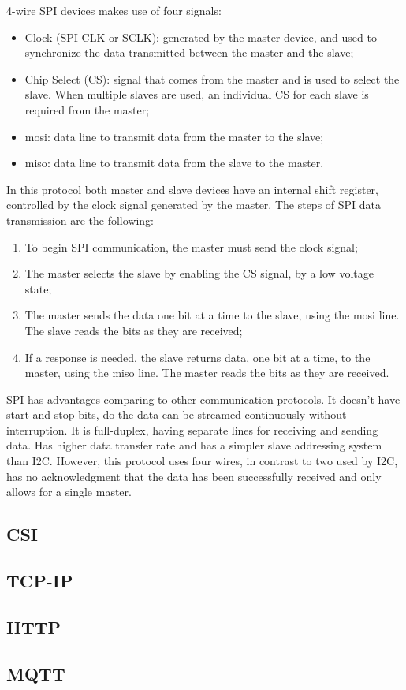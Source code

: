 4-wire SPI devices makes use of four signals:
\begin{itemize}
	\item Clock (SPI CLK or SCLK): generated by the master device, and used to synchronize the data transmitted between the master and the slave;
	\item Chip Select (CS): signal that comes from the master and is used to select the slave. When multiple slaves are used, an individual CS for each slave is required from the master;
	\item \ac{mosi}: data line to transmit data from the master to the slave;
	\item \ac{miso}: data line to transmit data from the slave to the master.
\end{itemize}


In this protocol both master and slave devices have an internal shift register, controlled by the clock signal generated by the master. The steps of SPI data transmission are the following:
\begin{enumerate}
	\item To begin SPI communication, the master must send the clock signal;
	\item The master selects the slave by enabling the CS signal, by a low voltage state;
	\item The master sends the data one bit at a time to the slave, using the \ac{mosi} line. The slave reads the bits as they are received;
	\item If a response is needed, the slave returns data, one bit at a time, to the master, using the \ac{miso} line. The master reads the bits as they are received.
\end{enumerate}

SPI has advantages comparing to other communication protocols. It doesn't have start and stop bits, do the data can be streamed continuously without interruption. It is full-duplex, having separate lines for receiving and sending data. Has higher data transfer rate and has a simpler slave addressing system than I2C. However, this protocol uses four wires, in contrast to two used by I2C, has no acknowledgment that the data has been successfully received and only allows for a single master. \cite{spi_basics}

\subsection{CSI}

\subsection{TCP-IP}

\subsection{HTTP}
\subsection{MQTT}